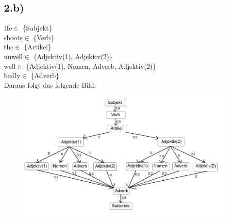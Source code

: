 \documentclass[a4paper]{article}
\begin{document}
\subsection*{2.b)}
\glqq He\grqq $\in$ \{Subjekt\} \\
\glqq shoots\grqq $\in$ \{Verb\} \\
\glqq the\grqq $\in$ \{Artikel\} \\
\glqq unwell\grqq $\in$ \{Adjektiv(1), Adjektiv(2)\} \\
\glqq well\grqq $\in$ \{Adjektiv(1), Nomen, Adverb, Adjektiv(2)\} \\
\glqq badly\grqq $\in$ \{Adverb\} \\
\pagebreak
Daraus folgt das folgende Bild.
\begin{figure}[!htbp]
\centering
\includegraphics[width = 1\columnwidth]{blatt6aufgabe2b}
\end{figure}
\end{document}
